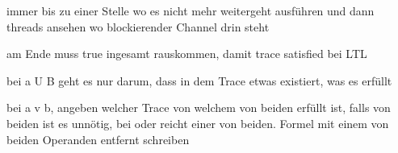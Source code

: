 \documentclass[landscape, a4paper]{article}
\begin{document}
\begin{minipage}[t]{0.19\linewidth}
	\begin{betterlist}
		\item immer bis zu einer Stelle wo es nicht mehr weitergeht ausführen und dann threads ansehen wo blockierender Channel drin steht
    \item am Ende muss true ingesamt rauskommen, damit trace satisfied bei LTL
    \item bei a U B geht es nur darum, dass in dem Trace etwas existiert, was es erfüllt
    \item bei a v b, angeben welcher Trace von welchem von beiden erfüllt ist, falls von beiden ist es unnötig, bei oder reicht einer von beiden. Formel mit einem von beiden Operanden entfernt schreiben
	\end{betterlist}
\end{minipage}
\end{document}
